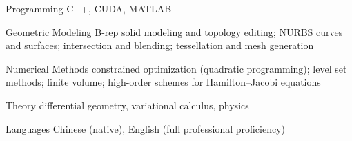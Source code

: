 
\begin{cvskills}
  \cvskill
    {Programming} %
    {C++, CUDA, MATLAB} %

  \cvskill
    {Geometric Modeling} %
    {B-rep solid modeling and topology editing; NURBS curves and surfaces; intersection and blending; tessellation and mesh generation} %

  \cvskill
    {Numerical Methods} %
    {constrained optimization (quadratic programming); level set methods; finite volume; high-order schemes for Hamilton--Jacobi equations} %

  \cvskill
    {Theory} %
    {differential geometry, variational calculus, physics} %

  \cvskill
    {Languages} %
    {Chinese (native), English (full professional proficiency)} %
\end{cvskills}
